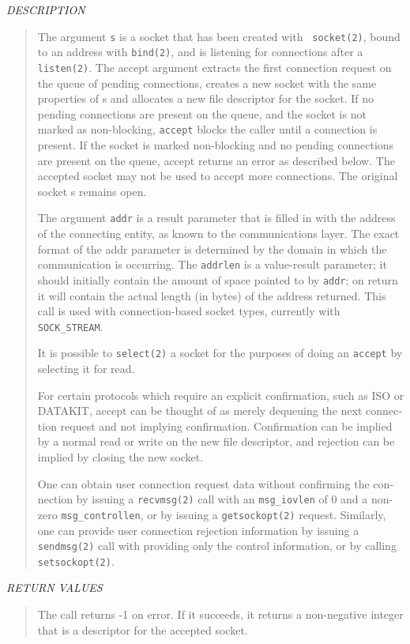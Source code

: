 \begin{appendix}
\begin{english}
{\sl DESCRIPTION}
\begin{quote}
	The argument {\tt s} is a socket that has been created with {\tt
socket(2)},
	bound to an address with {\tt bind(2)}, and is listening for 
	connections after a {\tt listen(2)}. The accept argument extracts the 
	first connection request on the queue of pending connections,
	creates a new socket with the same properties of s and allocates a
	new file descriptor for the socket. If no pending connections are
	present on the queue, and the socket is not marked as 
	non-blocking, {\tt accept} blocks the caller until a connection is
	present. If the socket is marked non-blocking and no pending
	connections are present on the queue, accept returns an error as
	described below. The accepted socket may not be used to accept 
	more connections. The original socket s remains open.

	The argument {\tt addr} is a result parameter that is filled in with the
	address of the connecting entity, as known to the communications
	layer. The exact format of the addr parameter is determined by
	the domain in which the communication is occurring. The {\tt addrlen} is
	a value-result parameter; it should initially contain the 
	amount of space pointed to by {\tt addr}; on return it will contain the 
	actual length (in bytes) of the address returned. This call is
	used with connection-based socket types, currently with
	{\tt SOCK\_STREAM}.

	It is possible to {\tt select(2)} a socket for the purposes of doing an
	{\tt accept} by selecting it for read.

	For certain protocols which require an explicit confirmation, such
	as ISO or DATAKIT, accept can be thought of as merely dequeuing the
	 next connection request and not implying confirmation. 
	Confirmation can be implied by a normal read or write on the new 
	file descriptor, and rejection can be implied by closing the new
	socket.

	One can obtain user connection request data without confirming the
	connection by issuing a {\tt recvmsg(2)} call with an {\tt msg\_iovlen} of 0
	and a non-zero {\tt msg\_controllen}, or by issuing a {\tt getsockopt(2)}
	request. Similarly, one can provide user connection rejection
	information by issuing a {\tt sendmsg(2)} call with providing only the 
	control information, or by calling {\tt setsockopt(2)}.
\end{quote}

{\sl RETURN VALUES}
\begin{quote}
	The call returns -1 on error. If it succeeds, it returns a
	non-negative integer that is a descriptor for the accepted
	socket.
\end{quote}


\end{english}
\end{appendix}
